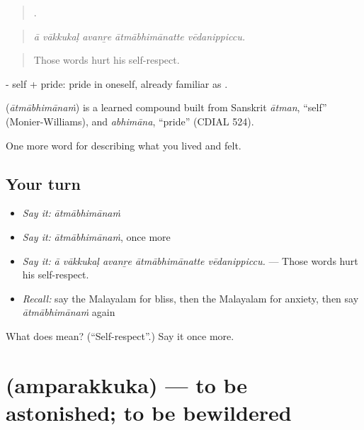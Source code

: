 \begin{quote}
    .
\end{quote}

\begin{quote}
\emph{ā vākkukaḷ avanṟe ātmābhimānatte vēdanippiccu.}
\end{quote}

\begin{quote}
Those words hurt his self-respect.
\end{quote}

- self +  pride: pride in oneself, already familiar as .

\begin{cousinweb}
\textbf{} (\emph{ātmābhimānaṁ}) is a learned compound built from Sanskrit \emph{ātman}, \textquotedblleft{}self\textquotedblright{} (Monier-Williams), and \emph{abhimāna}, \textquotedblleft{}pride\textquotedblright{} (CDIAL 524).
\end{cousinweb}

\begin{grammarlens}[title={What you've built}]
One more word for describing what you lived and felt.
\end{grammarlens}

\subsection*{Your turn}
\begin{itemize}
\raggedright
  \item \emph{Say it:} \emph{ātmābhimānaṁ}
  \item \emph{Say it:} \emph{ātmābhimānaṁ}, once more
  \item \emph{Say it:} \emph{ā vākkukaḷ avanṟe ātmābhimānatte vēdanippiccu.} — Those words hurt his self-respect.
  \item \emph{Recall:} say the Malayalam for bliss, then the Malayalam for anxiety, then say \emph{ātmābhimānaṁ} again
\end{itemize}

\begin{tcolorbox}[breakable,colback=teal!4,colframe=teal!35!black,title={Before you move on}]
What does  mean? (\textquotedblleft{}Self-respect\textquotedblright{}.) Say it once more.
\end{tcolorbox}
\section[\texorpdfstring{\ml{അമ്പരക്കുക} (amparakkuka)}{അമ്പരക്കുക (amparakkuka)}]{ (amparakkuka) — to be astonished; to be bewildered}

